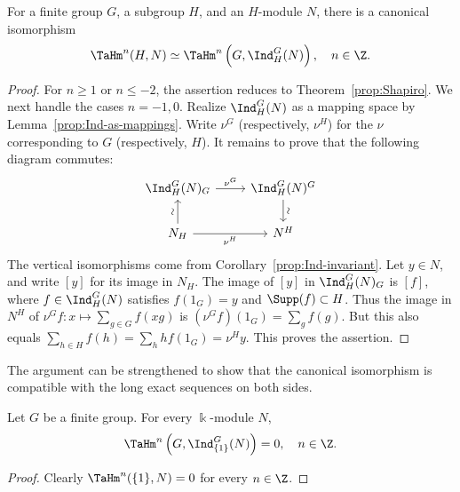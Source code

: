 \begin{proposition}
	For a finite group $G$, a subgroup $H$, and an $H$-module $N$, there is a
	canonical isomorphism
	\[ \TaHm^n(H, N) \simeq \TaHm^n\left( G, \Ind^G_H(N)\right), \quad n \in \Z. \]
\end{proposition}

\begin{proof}
	For $n \geq 1$ or $n \leq -2$, the assertion reduces to
	Theorem~\ref{prop:Shapiro}. We next handle the cases $n=-1,0$.
	Realize $\Ind^G_H(N)$ as a mapping space by
	Lemma~\ref{prop:Ind-as-mappings}. Write $\nu^G$ (respectively, $\nu^H$)
	for the $\nu$ corresponding to $G$ (respectively, $H$). It remains to
	prove that the following diagram commutes:
	\[\begin{tikzcd}
		\Ind^G_H(N)_G \arrow[r, "{\nu^G}"] & \Ind^G_H(N)^G \arrow[d, "\sim" sloped] \\
		N_H \arrow[u, "\sim" sloped] \arrow[r, "{\nu^H}"'] & N^H
	\end{tikzcd}\]
	The vertical isomorphisms come from
	Corollary~\ref{prop:Ind-invariant}. Let $y\in N$, and write $[y]$ for its
	image in $N_H$. The image of $[y]$ in $\Ind^G_H(N)_G$ is $[f]$, where
	$f\in\Ind^G_H(N)$ satisfies $f(1_G)=y$ and
	$\Supp(f)\subset H$. Thus the image in $N^H$ of
	$\nu^Gf:x\mapsto\sum_{g\in G}f(xg)$ is
	$(\nu^Gf)(1_G)=\sum_gf(g)$. But this also equals
	$\sum_{h\in H}f(h)=\sum_hhf(1_G)=\nu^Hy$. This proves the assertion.
\end{proof}

The argument can be strengthened to show that the canonical isomorphism is
compatible with the long exact sequences on both sides.

\begin{corollary}\label{prop:Tate-ind-vanishing}
	Let $G$ be a finite group. For every $\Bbbk$-module $N$,
	\[ \TaHm^n\left(G, \Ind^G_{\{1\}}(N)\right) = 0, \quad n \in \Z. \]
\end{corollary}

\begin{proof}
	Clearly $\TaHm^n(\{1\},N)=0$ for every $n\in\Z$.
\end{proof}

